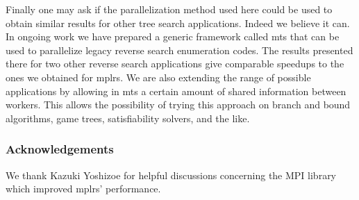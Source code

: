 \documentclass[a4paper,11pt]{article}   \usepackage{authblk} \usepackage[top=1.9cm,bottom=1.9cm,left=1.9cm,right=1.9cm]{geometry}
\newcommand{\progname}{\textsf}
\newcommand{\mplrs}{\progname{mplrs}\xspace}
\newcommand{\mts}{\progname{mts}\xspace}
\begin{document}
Finally one may ask if the parallelization method used here could be used
to obtain similar results for other tree search applications.
Indeed we believe it can. In ongoing work \cite{AJ16a} we have prepared a generic framework
called \mts that can be used to parallelize legacy reverse search enumeration codes.
The results presented there for two other reverse search applications
give comparable speedups to the ones we obtained for \mplrs.
We are also extending the range of possible applications by allowing
in \mts a certain amount of shared
information between workers. This allows the possibility of trying this approach
on branch and bound algorithms, game trees, satisfiability solvers, and the like.

\subsubsection*{Acknowledgements}
We thank Kazuki Yoshizoe for
helpful discussions concerning the MPI library
which improved \mplrs' performance.




\end{document}
